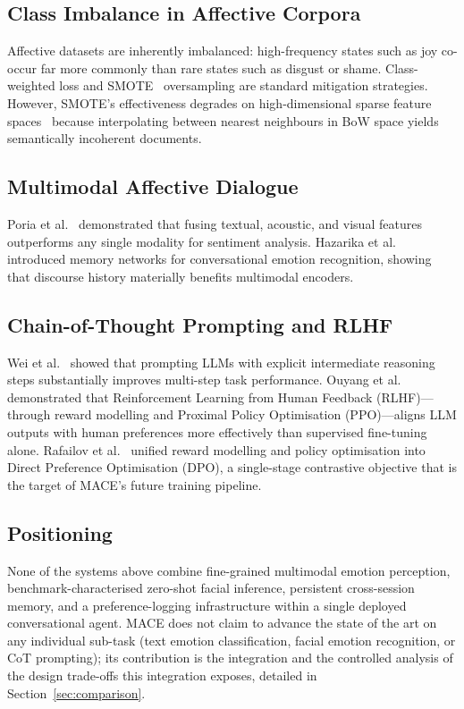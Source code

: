 \documentclass[sigconf, review=true]{acmart}
\begin{document}
\subsection{Class Imbalance in Affective Corpora}

Affective datasets are inherently imbalanced: high-frequency
states such as joy co-occur far more commonly than rare states
such as disgust or shame.
Class-weighted loss and SMOTE~\cite{chawla2002smote} oversampling
are standard mitigation strategies.
However, SMOTE's effectiveness degrades on high-dimensional sparse
feature spaces~\cite{blagus2013smote} because interpolating
between nearest neighbours in BoW space yields semantically
incoherent documents.

\subsection{Multimodal Affective Dialogue}

Poria et al.~\cite{poria2016convolutional} demonstrated that
fusing textual, acoustic, and visual features outperforms any
single modality for sentiment analysis.
Hazarika et al.~\cite{hazarika2018conversational} introduced
memory networks for conversational emotion recognition, showing
that discourse history materially benefits multimodal encoders.

\subsection{Chain-of-Thought Prompting and RLHF}

Wei et al.~\cite{wei2022chainofthought} showed that prompting
LLMs with explicit intermediate reasoning steps substantially
improves multi-step task performance.
Ouyang et al.~\cite{ouyang2022rlhf} demonstrated that
Reinforcement Learning from Human Feedback (RLHF)---through
reward modelling and Proximal Policy Optimisation (PPO)---aligns
LLM outputs with human preferences more effectively than
supervised fine-tuning alone.
Rafailov et al.~\cite{rafailov2023dpo} unified reward modelling
and policy optimisation into Direct Preference Optimisation (DPO),
a single-stage contrastive objective that is the target of
MACE's future training pipeline.

\subsection{Positioning}

None of the systems above combine fine-grained multimodal emotion
perception, benchmark-characterised zero-shot facial inference,
persistent cross-session memory, and a preference-logging
infrastructure within a single deployed conversational agent.
MACE does not claim to advance the state of the art on any
individual sub-task (text emotion classification, facial emotion
recognition, or CoT prompting); its contribution is the
integration and the controlled analysis of the design trade-offs
this integration exposes, detailed in Section~\ref{sec:comparison}.
\end{document}
